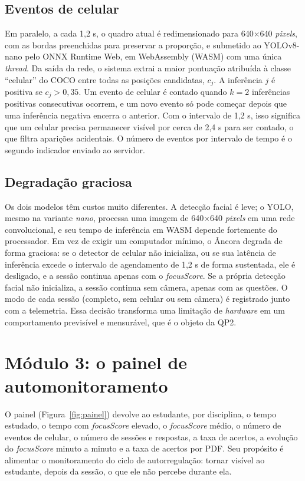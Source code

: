 \documentclass[portuguese,oneside]{tcc}
\newcommand{\ferramenta}{Âncora\xspace}
\newcommand{\estr}[1]{\emph{#1}}
\newcommand{\fs}{\emph{focusScore}\xspace}
\begin{document}
\subsection{\label{sec:celular}Eventos de celular}

Em paralelo, a cada 1,2 s, o quadro atual é redimensionado para 640$\times$640 \estr{pixels}, com as bordas preenchidas para preservar a proporção, e submetido ao YOLOv8-nano pelo ONNX Runtime Web, em WebAssembly (WASM) com uma única \estr{thread}. Da saída da rede, o sistema extrai a maior pontuação atribuída à classe ``celular'' do COCO entre todas as posições candidatas, $c_j$. A inferência $j$ é positiva se $c_j > 0{,}35$. Um evento de celular é contado quando $k = 2$ inferências positivas consecutivas ocorrem, e um novo evento só pode começar depois que uma inferência negativa encerra o anterior. Com o intervalo de 1,2 s, isso significa que um celular precisa permanecer visível por cerca de 2,4 s para ser contado, o que filtra aparições acidentais. O número de eventos por intervalo de tempo é o segundo indicador enviado ao servidor.

\subsection{\label{sec:degradacao}Degradação graciosa}

Os dois modelos têm custos muito diferentes. A detecção facial é leve; o YOLO, mesmo na variante \estr{nano}, processa uma imagem de 640$\times$640 \estr{pixels} em uma rede convolucional, e seu tempo de inferência em WASM depende fortemente do processador. Em vez de exigir um computador mínimo, o \ferramenta degrada de forma graciosa: se o detector de celular não inicializa, ou se sua latência de inferência excede o intervalo de agendamento de 1,2 s de forma sustentada, ele é desligado, e a sessão continua apenas com o \fs. Se a própria detecção facial não inicializa, a sessão continua sem câmera, apenas com as questões. O modo de cada sessão (completo, sem celular ou sem câmera) é registrado junto com a telemetria. Essa decisão transforma uma limitação de \estr{hardware} em um comportamento previsível e mensurável, que é o objeto da QP2.

\section{\label{sec:mod3}Módulo 3: o painel de automonitoramento}

O painel (Figura~\ref{fig:painel}) devolve ao estudante, por disciplina, o tempo estudado, o tempo com \fs elevado, o \fs médio, o número de eventos de celular, o número de sessões e respostas, a taxa de acertos, a evolução do \fs minuto a minuto e a taxa de acertos por PDF. Seu propósito é alimentar o monitoramento do ciclo de autorregulação: tornar visível ao estudante, depois da sessão, o que ele não percebe durante ela.
\end{document}
